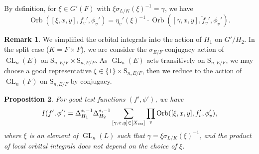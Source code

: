 \documentclass[11pt, reqno]{amsart}
\numberwithin{equation}{subsection}
\theoremstyle{plain}
\newtheorem{proposition}{Proposition}[subsection]
\theoremstyle{definition}
\newtheorem{remark}[proposition]{Remark}
\DeclareMathOperator{\GL}{GL}
\DeclareMathOperator{\Orb}{Orb}
\newcommand{\rss}{\textnormal{rss}}
\begin{document}
By definition, for $\xi \in G'(F)$ with
$\xi\sigma_{L/K}(\xi)^{-1} = \gamma$, we have
\[
    \Orb([\xi, x, y], f_v', \phi_v')
    = \eta_v'(\xi)^{-1}\cdot \Orb([\gamma, x, y], \widetilde f_v', \phi_v').
\]    

\begin{remark}
We simplified the orbital integrals into the action of $H_{1}$ on $G'/H_2$. In the split case ($K=F \times F$), we are consider the $\sigma_{E/F}$-conjugacy action of $\GL_n(E)$ on $\mathrm{S}_{n,E/F} \times \mathrm{S}_{n, E/F}$. As $\GL_n(E)$ acts transitively on $\mathrm{S}_{n,E/F}$, we may choose a good representative $\xi \in \{1\} \times \mathrm{S}_{n,E/F}$, then we reduce to the action of $\GL_n(F)$ on $\mathrm{S}_{n,E/F}$ by conjugacy. 
\end{remark}


\begin{proposition}
\label{prop:gldecomp}
For good test functions $(f', \phi')$, we have
\[
    I(f', \phi') = \Delta_{H_1}^{*,-1} \Delta_{H_2}^{*,-1} \sum_{[\gamma, x, y] \in [X_\rss]}
    \prod_v \Orb([\xi, x, y], f_v', 
    \phi_v'),
\]
where $\xi$ is an element of $\GL_n(L)$ such
that $\gamma = \xi\sigma_{L/K}(\xi)^{-1}$, and
the product of local orbital integrals does
not depend on the choice of $\xi$.
\end{proposition}
\end{document}
